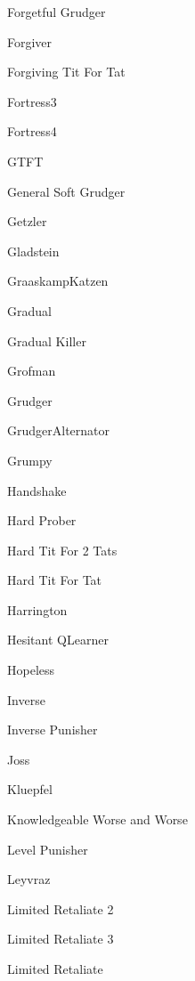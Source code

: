 \item Forgetful Grudger~\cite{axelrodproject}
\item Forgiver~\cite{axelrodproject}
\item Forgiving Tit For Tat~\cite{axelrodproject}
\item Fortress3~\cite{Ashlock2006}
\item Fortress4~\cite{Ashlock2006}
\item GTFT \cite{Gaudesi2016, Nowak1993}
\item General Soft Grudger~\cite{axelrodproject}
\item Getzler~\cite{Axelrod1980b}
\item Gladstein~\cite{Axelrod1980b}
\item GraaskampKatzen~\cite{Axelrod1980b}
\item Gradual~\cite{Beaufils1997}
\item Gradual Killer~\cite{prison}
\item Grofman\cite{Axelrod1980a}
\item Grudger~\cite{Axelrod1980a, Banks1990, Beaufils1997, Van2015, Li2011}
\item GrudgerAlternator~\cite{prison}
\item Grumpy~\cite{axelrodproject}
\item Handshake~\cite{Robson1990}
\item Hard Prober~\cite{prison}
\item Hard Tit For 2 Tats~\cite{Stewart2012}
\item Hard Tit For Tat~\cite{PD2017}
\item Harrington~\cite{Axelrod1980b}
\item Hesitant QLearner\cite{axelrodproject}
\item Hopeless~\cite{Van2015}
\item Inverse~\cite{axelrodproject}
\item Inverse Punisher~\cite{axelrodproject}
\item Joss~\cite{Axelrod1980a, Stewart2012}
\item Kluepfel~\cite{Axelrod1980b}
\item Knowledgeable Worse and Worse~\cite{axelrodproject}
\item Level Punisher~\cite{Eckhart2015}
\item Leyvraz~\cite{Axelrod1980b}
\item Limited Retaliate 2~\cite{axelrodproject}
\item Limited Retaliate 3~\cite{axelrodproject}
\item Limited Retaliate~\cite{axelrodproject}
